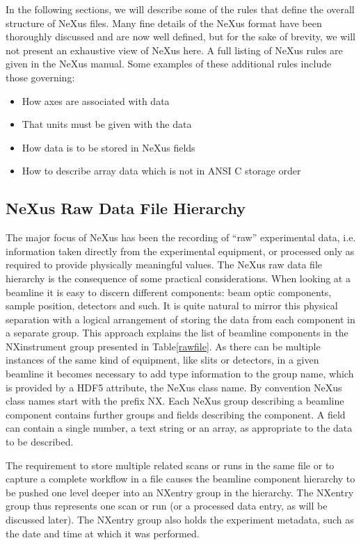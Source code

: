 \documentclass[%
 aip,
rsi,
 amsmath,amssymb,
 reprint,%
]{revtex4-1}
\begin{document}
In the following sections, we will describe some of the rules that define the overall structure of NeXus files. Many fine details 
of the NeXus format have been thoroughly discussed and are now well defined, but for the sake of brevity, we will not present an 
exhaustive view of NeXus here. A full listing of NeXus rules are given in the NeXus manual\cite{nxman}. Some examples of these 
additional rules include those governing:
\begin{itemize}
\item How axes are associated with data
\item That units must be given with the data
\item How data is to be stored in NeXus fields
\item How to describe array data which is not in ANSI C storage order
\end{itemize}



\subsection{NeXus Raw Data File Hierarchy}
The major focus of NeXus has been the recording of ``raw'' experimental data, i.e. information taken directly from the experimental 
equipment, or processed only as required to provide physically meaningful values.
The NeXus raw data file hierarchy is the consequence of some practical considerations. When looking at a beamline it is easy to 
discern different components: beam optic components, sample position, detectors and such. It is quite natural to mirror this physical 
separation with a logical arrangement of storing the data from each component in a separate group. This approach explains the 
list of beamline components in the NXinstrument group presented in Table\ref{rawfile}. 
As there can be multiple instances of the same kind of equipment, like slits or detectors, in a given beamline it becomes necessary
to add type information to the group name,
which is provided by a HDF5 attribute, the NeXus class name.
By convention NeXus class names start 
with the prefix NX. Each NeXus group describing a beamline component contains further groups and fields describing the component. 
A field can contain a single number, a text string or an array, as appropriate to the data to be described.  

The requirement to store multiple related scans or runs  in the same file or to capture 
a complete workflow in a file causes the beamline component hierarchy to be pushed one level deeper into an NXentry 
group in the hierarchy. The NXentry  group thus represents one scan or run (or a processed data entry, as will be discussed later). 
The NXentry group also holds the experiment metadata, such as the date and time at which it was performed. 
\end{document}
